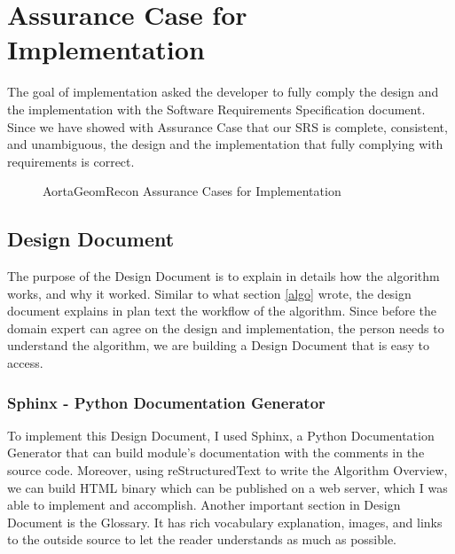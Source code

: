 \section{Assurance Case for Implementation}
The goal of implementation asked the developer to fully comply the design and the implementation with the Software Requirements Specification document. Since we have showed with Assurance Case that our SRS is complete, consistent, and unambiguous, the design and the implementation that fully complying with requirements is correct.

\begin{figure}[H]
    \centering
    \caption[AortaGeomRecon Assurance Cases for Implementation]{AortaGeomRecon Assurance Cases for Implementation}
    \label{fig_agr_ac_gi}
\end{figure}

\subsection{Design Document}
The purpose of the Design Document \citep{DD} is to explain in details how the algorithm works, and why it worked. Similar to what section \ref{algo} wrote, the design document explains in plan text the workflow of the algorithm. Since before the domain expert can agree on the design and implementation, the person needs to understand the algorithm, we are building a Design Document that is easy to access. 

\subsubsection{Sphinx - Python Documentation Generator}
To implement this Design Document, I used Sphinx, a Python Documentation Generator that can build module's documentation with the comments in the source code. Moreover, using reStructuredText to write the Algorithm Overview, we can build HTML binary which can be published on a web server, which I was able to implement and accomplish. Another important section in Design Document is the Glossary. It has rich vocabulary explanation, images, and links to the outside source to let the reader understands as much as possible.

